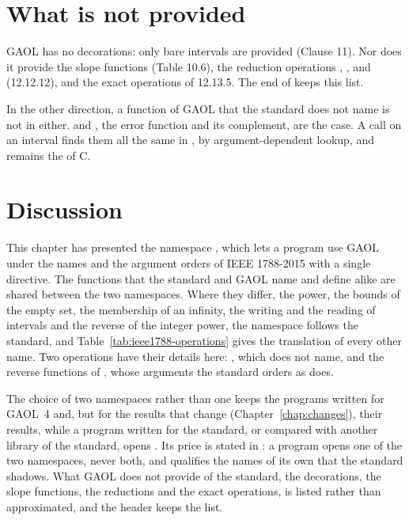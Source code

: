 \documentclass[12pt,a4paper,twoside,openright]{book}
\begin{document}
\section{What is not provided}\label{sec:ieee1788-missing}
%

GAOL has no decorations: only bare intervals are provided (Clause 11). Nor
does it provide the slope functions (Table 10.6), the reduction operations
, ,  and  (12.12.12), and
the exact operations of 12.13.5. The end of 
keeps this list.

\begin{Rem}\label{rem:ieee1788-erf}
In the other direction, a function of GAOL that the standard does not name
is not in  either.  and , the
error function and its complement, are the case.\newinvfive{} A call
 on an interval finds them all the same in ,
by argument-dependent lookup, and  remains the 
of C.
\end{Rem}

\section{Discussion}

This chapter has presented the namespace , which lets a
program use GAOL under the names and the argument orders of IEEE 1788-2015
with a single directive. The functions that the standard and GAOL name and
define alike are shared between the two namespaces. Where they differ, the
power, the bounds of the empty set, the membership of an infinity, the
writing and the reading of intervals and the reverse of the integer power,
the namespace follows the standard, and Table~\ref{tab:ieee1788-operations}
gives the translation of every other name. Two operations have their
details here: , which  does not name, and the
reverse functions of , whose arguments the standard orders as
 does.

\medskip
The choice of two namespaces rather than one keeps the programs written for
GAOL~4 and, but for the results that change (Chapter~\ref{chap:changes}),
their results, while a program written for the standard, or compared with
another library of the standard, opens . Its price is
stated in : a program opens one of the two
namespaces, never both, and qualifies the names of its own that the standard
shadows. What GAOL does not provide of the standard, the decorations, the
slope functions, the reductions and the exact operations, is listed rather
than approximated, and the header keeps the list.
\end{document}
